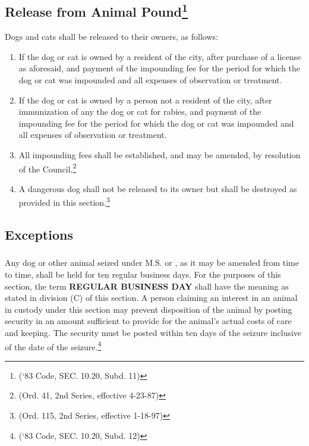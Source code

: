 \subsection{Release from Animal Pound\footnote{(‘83 Code, SEC. 10.20, Subd. 11)}}
Dogs and cats shall be released to their owners, as follows:
\begin{enumerate}[{\indent}1)]
    \item If the dog or cat is owned by a resident of the city, after purchase of a license as aforesaid, and payment of the impounding fee for the period for which the dog or cat was impounded and all expenses of observation or treatment.
    \item If the dog or cat is owned by a person not a resident of the city, after immunization of any the dog or cat for rabies, and payment of the impounding fee for the period for which the dog or cat was impounded and all expenses of observation or treatment.
    \item All impounding fees shall be established, and may be amended, by resolution of the Council.\footnote{(Ord. 41, 2nd Series, effective 4-23-87)}
    \item A dangerous dog shall not be released to its owner but shall be destroyed as provided in this section.\footnote{(Ord. 115, 2nd Series, effective 1-18-97)}
\end{enumerate}
\subsection{Exceptions}
\subsubsection{}
Any dog or other animal seized under M.S.  or , as it may be amended from time to time, shall be held for ten regular business days.  For the purposes of this section, the term \textbf{REGULAR BUSINESS DAY} shall have the meaning as stated in division (C) of this section.  A person claiming an interest in an animal in custody under this section may prevent disposition of the animal by posting security in an amount sufficient to provide for the animal’s actual costs of care and keeping.  The security must be posted within ten days of the seizure inclusive of the date of the seizure.\footnote{(‘83 Code, SEC. 10.20, Subd. 12)}
